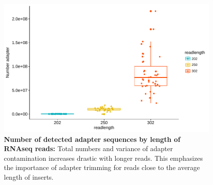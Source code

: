 \begin{figure}
	\centering
	\includegraphics[width=\columnwidth]{./Figures/adapter_contam.pdf}
	\caption{\textbf{Number of detected adapter sequences by length of RNAseq reads:} Total numbers and variance of adapter contamination increases drastic with longer reads. This emphasizes the importance of adapter trimming for reads close to the average length of inserts.}
	\label{fig:adapter_contam}
\end{figure}



